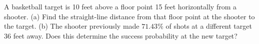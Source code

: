 A basketball target is 10 feet above a floor point 15 feet horizontally from a shooter. (a) Find the straight-line distance from that floor point at the shooter to the target. (b) The shooter previously made $71.43\%$ of shots at a different target 36 feet away. Does this determine the success probability at the new target?
